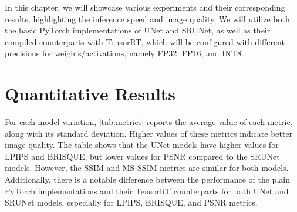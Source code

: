 \label{chap:Experiments}

% 
% 
% 


In this chapter, we will showcase various experiments and their corresponding results, highlighting the inference speed and image quality. We will utilize both the basic PyTorch implementations of UNet and SRUNet, as well as their compiled counterparts with TensorRT, which will be configured with different precisions for weights/activations, namely FP32, FP16, and INT8.

\section{Quantitative Results}
\label{sec:quantitative-results}

For each model variation, \cref{tab:metrics} reports the average value of each metric, along with its standard deviation. Higher values of these metrics indicate better image quality. The table shows that the UNet models have higher values for LPIPS and BRISQUE, but lower values for PSNR compared to the SRUNet models. However, the SSIM and MS-SSIM metrics are similar for both models. Additionally, there is a notable difference between the performance of the plain PyTorch implementations and their TensorRT counterparts for both UNet and SRUNet models, especially for LPIPS, BRISQUE, and PSNR metrics.

